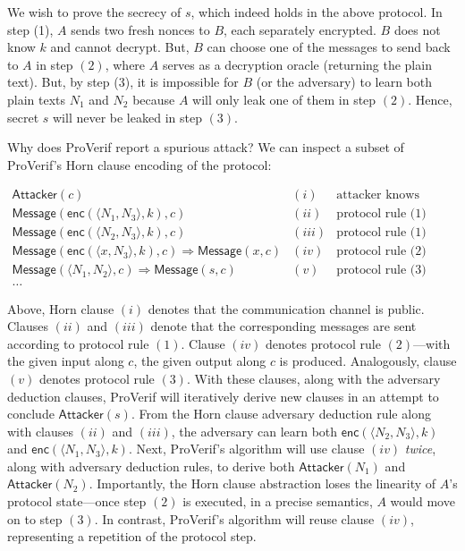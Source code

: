\documentclass{article}
\theoremstyle{definition}
\begin{document}
We wish to prove the secrecy of $s$, which indeed holds in the above protocol. In step (1), $A$ sends two fresh nonces to $B$, each separately encrypted. $B$ does not know $k$ and cannot decrypt. But, $B$ can choose one of the messages to send back to $A$ in step $(2)$, where $A$ serves as a decryption oracle (returning the plain text). But, by step (3), it is impossible for $B$ (or the adversary) to learn both plain texts $N_1$ and $N_2$ because $A$ will only leak one of them in step $(2)$. Hence, secret $s$ will never be leaked in step $(3)$. 

Why does ProVerif report a spurious attack? We can inspect a subset of ProVerif's Horn clause encoding of the protocol:

$
\begin{array}{ccl}
    \mathsf{Attacker}(c) & (i) & \text{attacker knows network channel} \\ 
   \mathsf{Message}(\mathsf{enc}(\langle N_1, N_3 \rangle, k), c) & (ii)& \text{protocol rule (1) (part one)}\\
   \mathsf{Message}(\mathsf{enc}(\langle N_2, N_3 \rangle, k), c) & (iii) & \text{protocol rule (1) (part two)}\\ 
   \mathsf{Message}(\mathsf{enc}(\langle x, N_3 \rangle, k), c) \Rightarrow \textsf{Message}(x, c) & (iv) & \text{protocol rule (2)}\\
   \mathsf{Message}(\langle N_1, N_2 \rangle, c) \Rightarrow \textsf{Message}(s, c) & (v) & \text{protocol rule (3)}\\
    \dots 
\end{array}
$


Above, Horn clause $(i)$ denotes that the communication channel is public. Clauses $(ii)$ and $(iii)$ denote that the corresponding messages are sent according to protocol rule $(1)$. Clause $(iv)$ denotes  protocol rule $(2)$---with the given input along $c$, the given output along $c$ is produced. Analogously, clause $(v)$ denotes protocol rule $(3)$. With these clauses, along with the adversary deduction clauses, ProVerif will iteratively derive new clauses in an attempt to conclude $\mathsf{Attacker}(s)$. From the Horn clause adversary deduction rule along with clauses $(ii)$ and $(iii)$, the adversary can learn both $\mathsf{enc}(\langle N_2, N_3 \rangle, k)$ and $\mathsf{enc}(\langle N_1, N_3 \rangle, k)$. Next, ProVerif's algorithm will use clause $(iv)$ \textit{twice}, along with adversary deduction rules, to derive both $\mathsf{Attacker}(N_1)$ and $\mathsf{Attacker}(N_2)$. Importantly, the Horn clause abstraction loses the linearity of $A$'s protocol state---once step $(2)$ is executed, in a precise semantics, $A$  would move on to step $(3)$. In contrast, ProVerif's algorithm will reuse clause $(iv)$, representing a repetition of the protocol step.
\end{document}
